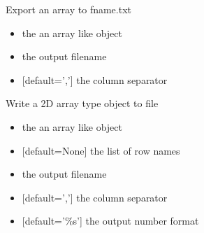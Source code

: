 \documentclass[letterpaper,10pt,english]{sphinxmanual}
\begin{document}
\begin{fulllineitems}
\label{\detokenize{modules_doc:cbmpy.CBTools.exportArray2TXT}}
\pysigstartsignatures
{}
\pysigstopsignatures
\sphinxAtStartPar
Export an array to fname.txt
\begin{itemize}
\item {} 
\sphinxAtStartPar
{} the an array like object

\item {} 
\sphinxAtStartPar
{} the output filename

\item {} 
\sphinxAtStartPar
{} {[}default=’,’{]} the column separator

\end{itemize}

\end{fulllineitems}


\begin{fulllineitems}
\label{\detokenize{modules_doc:cbmpy.CBTools.exportLabelledArray}}
\pysigstartsignatures
{}
\pysigstopsignatures
\sphinxAtStartPar
Write a 2D array type object to file
\begin{itemize}
\item {} 
\sphinxAtStartPar
{} the an array like object

\item {} 
\sphinxAtStartPar
{} {[}default=None{]} the list of row names

\item {} 
\sphinxAtStartPar
{} the output filename

\item {} 
\sphinxAtStartPar
{} {[}default=’,’{]} the column separator

\item {} 
\sphinxAtStartPar
{} {[}default=’\%s’{]} the output number format

\end{itemize}

\end{fulllineitems}
\end{document}
